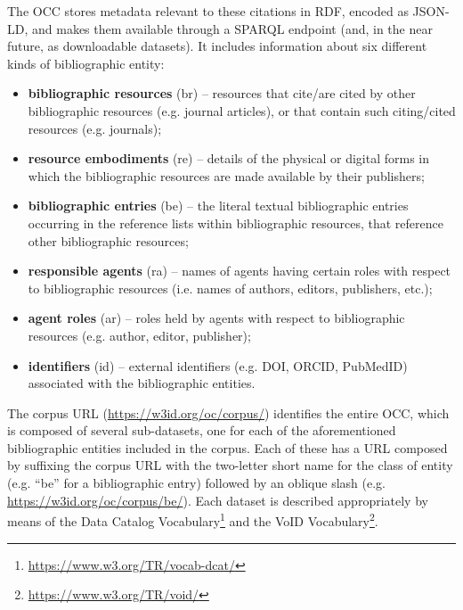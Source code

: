 \documentclass[runningheads,a4paper]{llncs}
\begin{document}
The OCC stores metadata relevant to these citations in RDF, encoded as JSON-LD, and makes them available through a SPARQL endpoint (and, in the near future, as downloadable datasets). It includes information about six different kinds of bibliographic entity:
\begin{itemize}
\item {\bf bibliographic resources} (br) -- resources that cite/are cited by other bibliographic resources (e.g. journal articles), or that contain such citing/cited resources (e.g. journals);
\item {\bf resource embodiments} (re) -- details of the physical or digital forms in which the bibliographic resources are made available by their publishers;
\item {\bf bibliographic entries} (be) -- the literal textual bibliographic entries occurring in the reference lists within bibliographic resources, that reference other bibliographic resources;
\item {\bf responsible agents} (ra) -- names of agents having certain roles with respect to bibliographic resources (i.e. names of authors, editors, publishers, etc.);
\item {\bf agent roles} (ar) -- roles held by agents with respect to bibliographic resources (e.g. author, editor, publisher);
\item {\bf identifiers} (id) -- external identifiers (e.g. DOI, ORCID, PubMedID) associated with the bibliographic entities.
\end{itemize}

The corpus URL (\url{https://w3id.org/oc/corpus/}) identifies the entire OCC, which is composed of several sub-datasets, one for each of the aforementioned bibliographic entities included in the corpus. Each of these has a URL composed by suffixing the corpus URL with the two-letter short name for the class of entity (e.g. ``be'' for a bibliographic entry) followed by an oblique slash (e.g. \url{https://w3id.org/oc/corpus/be/}). Each dataset is described appropriately by means of the Data Catalog Vocabulary\footnote{\url{https://www.w3.org/TR/vocab-dcat/}} and the VoID Vocabulary\footnote{\url{https://www.w3.org/TR/void/}}.
\end{document}
